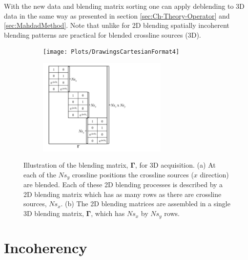 
With the new data and blending matrix sorting one can apply deblending to 3D data in the same way as presented in section \ref{sec:Ch-Theory-Operator} and \ref{sec:MahdadMethod}. Note that unlike for 2D blending spatially incoherent blending patterns are practical for blended crossline sources (3D).

\begin{figure}

	\begin{subfigure}[t]{0.5\textwidth}
		\centering
		\texttt{[image: Plots/DrawingsCartesianFormat4]}
		\caption{}
		\label{fig:Ch-Theory-3D-BlendedAcquisition}
	\end{subfigure}
	\begin{subfigure}[t]{0.5\textwidth}
		\centering
		\includegraphics[width = 0.7\textwidth]{Plots/DrawingsCartesianFormat2}
		\caption{}
		\label{fig:Ch-Theory-3D-BlendingMatrix}
	\end{subfigure}
	
	\caption{Illustration of the blending matrix, $\mathbf{\Gamma}$, for 3D acquisition. (a) At each of the $Ns_y$ crossline positions the crossline sources ($x$ direction) are blended. Each of these 2D blending processes is described by a 2D blending matrix which has as many rows as there are crossline sources, $Ns_x$. (b) The 2D blending matrices are assembled in a single 3D blending matrix, $\mathbf{\Gamma}$, which has $Ns_x$ by $Ns_y$ rows.}
	\label{fig:Ch-Theory-3D-BlendingMatrix-Design}

\end{figure}

\section{Incoherency}


